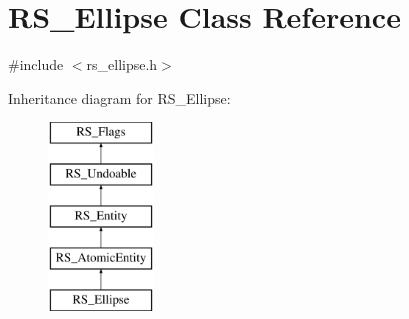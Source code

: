 \hypertarget{classRS__Ellipse}{\section{R\-S\-\_\-\-Ellipse Class Reference}
\label{classRS__Ellipse}
}


{\ttfamily \#include $<$rs\-\_\-ellipse.\-h$>$}

Inheritance diagram for R\-S\-\_\-\-Ellipse\-:\begin{figure}[H]
\begin{center}
\leavevmode
\includegraphics[height=5.000000cm]{classRS__Ellipse}
\end{center}
\end{figure}

